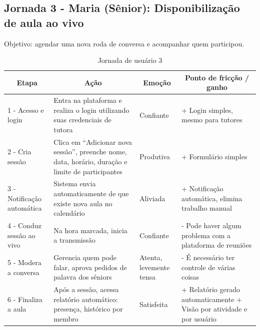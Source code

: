 \subsection{Jornada 3 - Maria (Sênior): Disponibilização de aula ao vivo}
Objetivo: agendar uma nova roda de conversa e acompanhar quem participou.
\begin{table}[H]
\centering
\caption{Jornada de usuário 3}
\label{tab:jornada3}
\begin{tabular}{|m{3.2cm}|m{5cm}|m{2.5cm}|m{4.5cm}|}
\hline
\multicolumn{1}{|c|}{\textbf{Etapa}} & \multicolumn{1}{c|}{\textbf{Ação}} & \multicolumn{1}{c|}{\textbf{Emoção}} & \multicolumn{1}{c|}{\textbf{Ponto de fricção / ganho}} \\ \hline

1 - Acesso e login & Entra na plataforma e realiza o login utilizando suas credenciais de tutora & Confiante & + Login simples, mesmo para tutores \\ \hline

2 - Cria sessão & Clica em ``Adicionar nova sessão'', preenche nome, data, horário, duração e limite de participantes & Produtiva & + Formulário simples \\ \hline

3 - Notificação automática & Sistema envia automaticamente de que existe nova aula no calendário & Aliviada & + Notificação automática, elimina trabalho manual \\ \hline

4 - Conduz sessão ao vivo & Na hora marcada, inicia a transmissão & Confiante & - Pode haver algum problema com a plataforma de reuniões \\ \hline

5 - Modera a conversa & Gerencia quem pode falar, aprova pedidos de palavra dos sêniors & Atenta, levemente tensa & - É necessário ter controle de várias coisas \\ \hline

6 - Finaliza a aula & Após a sessão, acessa relatório automático: presença, histórico por membro & Satisfeita & + Relatório gerado automaticamente \newline\newline + Visão por atividade e por usuário \\ \hline
\end{tabular}
\end{table}